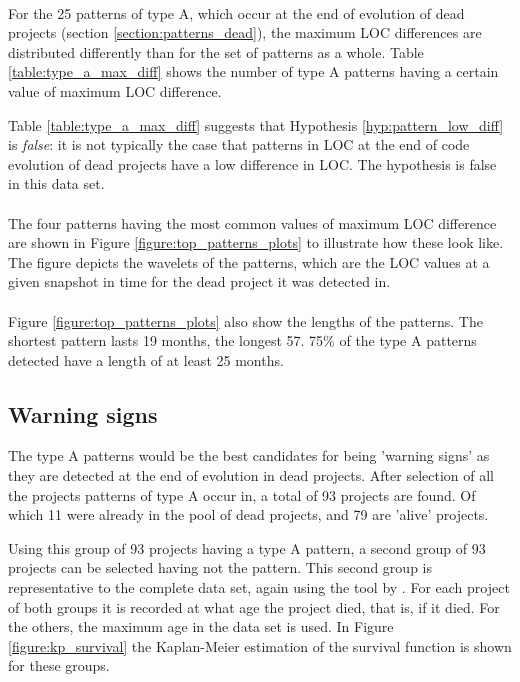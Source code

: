 \paragraph{}
For the 25 patterns of type A, which occur at the end of evolution of dead
projects (section \ref{section:patterns_dead}), the maximum LOC differences are
distributed differently than for the set of patterns as a whole. Table
\ref{table:type_a_max_diff} shows the number of type A patterns having a
certain value of maximum LOC difference.



\noindent
Table \ref{table:type_a_max_diff} suggests that Hypothesis
\ref{hyp:pattern_low_diff} is \emph{false}\rm: it is not typically the case
that patterns in LOC at the end of code evolution of dead projects have a low
difference in LOC. The hypothesis is false in this data set.

\paragraph{}
The four patterns having the most common values of maximum LOC difference are
shown in Figure \ref{figure:top_patterns_plots} to illustrate how these look
like. The figure depicts the wavelets of the patterns, which are the LOC values
at a given snapshot in time for the dead project it was detected in.



\paragraph{}
Figure \ref{figure:top_patterns_plots} also show the lengths of the patterns.
The shortest pattern lasts 19 months, the longest 57. 75\% of the type A
patterns detected have a length of at least 25 months.

\subsection{Warning signs}
The type A patterns would be the best candidates for being 'warning signs' as
they are detected at the end of evolution in dead projects. After selection of
all the projects patterns of type A occur in, a total of 93 projects are found.
Of which 11 were already in the pool of dead projects, and 79 are 'alive'
projects.

Using this group of 93 projects having a type A pattern, a second group of 93
projects can be selected having not the pattern. This second group is
representative to the complete data set, again using the tool by
\citet{nagappan}. For each project of both groups it is recorded at what age the
project died, that is, if it died. For the others, the maximum age in the data
set is used. In Figure \ref{figure:kp_survival} the Kaplan-Meier estimation of
the survival function is shown for these groups.

